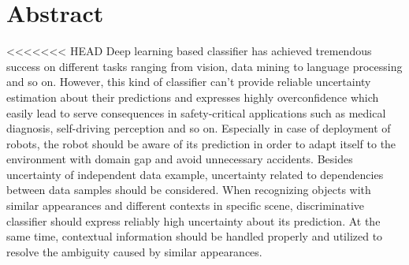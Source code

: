 
\thispagestyle{plain}

\section*{Abstract}

<<<<<<< HEAD
Deep learning based classifier has achieved tremendous success on different tasks ranging from vision, data mining to language processing and so on. However, this kind of classifier can't provide reliable uncertainty estimation about their predictions and expresses highly overconfidence which easily lead to serve consequences in safety-critical applications such as medical diagnosis, self-driving perception and so on. Especially in case of deployment of robots, the robot should be aware of its prediction in order to adapt itself to the environment with domain gap and avoid unnecessary accidents. Besides uncertainty of independent data example, uncertainty related to dependencies between data samples should be considered. When recognizing objects with similar appearances and different contexts in specific scene, discriminative classifier should express reliably high uncertainty about its prediction. At the same time, contextual information should be handled properly and utilized to resolve the ambiguity caused by similar appearances. 

